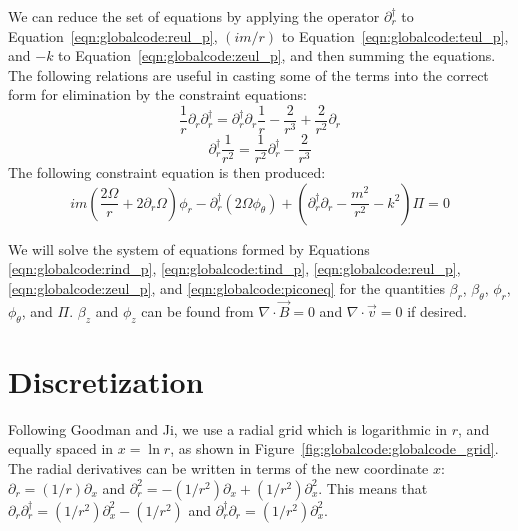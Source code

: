 \documentclass[letterpaper]{article}
\begin{document}
We can reduce the set of equations by applying the operator
$\partial_r^\dagger$ to Equation~\ref{eqn:globalcode:reul_p}, $(im/r)$
to Equation~\ref{eqn:globalcode:teul_p}, and $-k$ to
Equation~\ref{eqn:globalcode:zeul_p}, and then summing the equations.
The following relations are useful in casting some of the terms into
the correct form for elimination by the constraint equations:
\begin{equation}
\frac{1}{r}\partial_r \partial_r^\dagger
 = \partial_r^\dagger \partial_r \frac{1}{r}
 - \frac{2}{r^3} + \frac{2}{r^2}\partial_r
\end{equation}
\begin{equation}
\partial_r^\dagger \frac{1}{r^2}
 = \frac{1}{r^2} \partial_r^\dagger - \frac{2}{r^3}
\end{equation}
The following constraint equation is then produced:
\begin{equation}\label{eqn:globalcode:piconeq}
im\left(\frac{2\Omega}{r}+2\partial_r \Omega\right)\phi_r 
 - \partial_r^\dagger\left(2\Omega\phi_\theta\right)
 + \left(\partial_r^\dagger \partial_r - \frac{m^2}{r^2}-k^2\right)\Pi = 0
\end{equation}

We will solve the system of equations formed by Equations
\ref{eqn:globalcode:rind_p}, \ref{eqn:globalcode:tind_p},
\ref{eqn:globalcode:reul_p}, \ref{eqn:globalcode:zeul_p}, and
\ref{eqn:globalcode:piconeq} for the quantities $\beta_r$,
$\beta_\theta$, $\phi_r$, $\phi_\theta$, and $\Pi$. $\beta_z$ and
$\phi_z$ can be found from $\nabla\cdot\vec{B}=0$ and
$\nabla\cdot\vec{v}=0$ if desired.


\section{Discretization}

Following Goodman and Ji, we use a radial grid which is logarithmic in
$r$, and equally spaced in $x=\ln{r}$, as shown in
Figure~\ref{fig:globalcode:globalcode_grid}.  The radial derivatives
can be written in terms of the new coordinate $x$: $\partial_r =
(1/r)\partial_x$ and $\partial_r^2 = -(1/r^2)\partial_x +
(1/r^2)\partial_x^2$.  This means that $\partial_r \partial_r^\dagger
= (1/r^2)\partial_x^2 - (1/r^2)$ and $\partial_r^\dagger \partial_r =
(1/r^2)\partial_x^2$.
\end{document}
